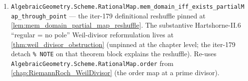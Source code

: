\begin{enumerate}
    \(Z(f)\) is either empty or of pure codimension \(1\) in \(X\).
  \item %
    \texttt{AlgebraicGeometry.Scheme.RationalMap.mem\_domain\_iff\_exists\_partialMap\_through\_point}
    --- the iter-179 definitional reshuffle pinned at
    \cref{lem:mem_domain_partial_map_reshuffle}. The substantive
    Hartshorne-II.6 ``regular = no pole'' Weil-divisor reformulation lives
    at \cref{thm:weil_divisor_obstruction} (unpinned at the chapter level;
    the iter-179 detach \texttt{\% NOTE} on that theorem block explains the
    reshuffle). Re-uses
    \texttt{AlgebraicGeometry.Scheme.RationalMap.order} from
    \cref{chap:RiemannRoch_WeilDivisor} (the order map at a prime divisor).
\end{enumerate}

